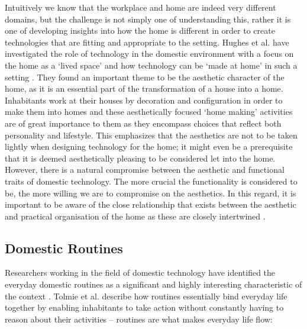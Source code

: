 Intuitively we know that the workplace and home are indeed very different domains, but the challenge is not simply one of understanding this, rather it is one of developing insights into how the home is different in order to create technologies that are fitting and appropriate to the setting. Hughes et al. have investigated the role of technology in the domestic environment with a focus on the home as a ‘lived space’ and how technology can be ‘made at home’ in such a setting \cite{hughes1998understanding}. They found an important theme to be the aesthetic character of the home, as it is an essential part of the transformation of a house into a home. Inhabitants work at their houses by decoration and configuration in order to make them into homes and these aesthetically focused ‘home making’ activities are of great importance to them as they encompass choices that reflect both personality and lifestyle. This emphasizes that the aesthetics are not to be taken lightly when designing technology for the home; it might even be a prerequisite that it is deemed aesthetically pleasing to be considered let into the home. However, there is a natural compromise between the aesthetic and functional traits of domestic technology. The more crucial the functionality is considered to be, the more willing we are to compromise on the aesthetics. In this regard, it is important to be aware of the close relationship that exists between the aesthetic and practical organisation of the home as these are closely intertwined \cite{hughes1998understanding}.
\subsection{Domestic Routines}
Researchers working in the field of domestic technology have identified the everyday domestic routines as a significant and highly interesting characteristic of the context \cite{edwards2001home,crabtree2004domestic,tolmie2002unremarkable}. Tolmie et al. describe how routines essentially bind everyday life together by enabling inhabitants to take action without constantly having to reason about their activities \cite{tolmie2002unremarkable} -- routines are what makes everyday life flow:



